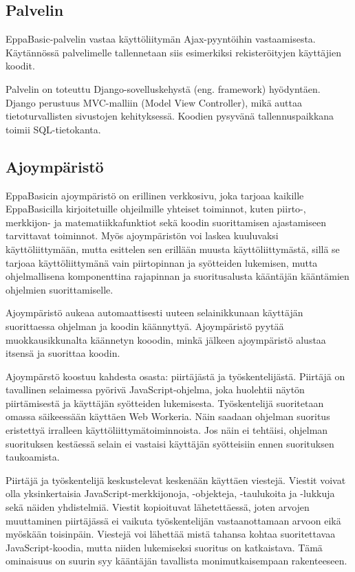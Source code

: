 \subsection{Palvelin}
EppaBasic-palvelin vastaa käyttöliitymän Ajax-pyyntöihin
vastaamisesta. Käytännössä palvelimelle tallennetaan
siis esimerkiksi rekisteröityjen käyttäjien koodit.

Palvelin on toteuttu Django-sovelluskehystä (eng. framework)
hyödyntäen. Django perustuus MVC-malliin (Model View Controller),
mikä auttaa tietoturvallisten sivustojen kehityksessä. Koodien
pysyvänä tallennuspaikkana toimii SQL-tietokanta.

\subsection{Ajoympäristö}
EppaBasicin ajoympäristö on erillinen verkkosivu,
joka tarjoaa kaikille EppaBasicilla kirjoitetuille
ohjeilmille yhteiset toiminnot, kuten piirto-,
merkkijon- ja matematiikkafunktiot sekä
koodin suorittamisen ajastamiseen tarvittavat toiminnot.
Myös ajoympäristön voi laskea kuuluvaksi käyttöliittymään,
mutta esittelen sen erillään muusta käyttöliittymästä,
sillä se tarjoaa käyttöliittymänä vain piirtopinnan
ja syötteiden lukemisen, mutta ohjelmallisena
komponenttina rajapinnan ja suoritusalusta kääntäjän
kääntämien ohjelmien suorittamiselle.

Ajoympäristö aukeaa automaattisesti uuteen selainikkunaan
käyttäjän suorittaessa ohjelman ja koodin käännyttyä.
Ajoympäristö pyytää muokkausikkunalta käännetyn kooodin,
minkä jälkeen ajoympäristö alustaa itsensä ja suorittaa koodin.

Ajoympärstö koostuu kahdesta osasta:
piirtäjästä ja työskentelijästä.
Piirtäjä on tavallinen selaimessa pyörivä
JavaScript-ohjelma, joka huolehtii
näytön piirtämisestä ja käyttäjän syötteiden lukemisesta.
Työskentelijä suoritetaan omassa säikeessään
käyttäen Web Workeria.
Näin saadaan ohjelman suoritus eristettyä
irralleen käyttöliittymätoiminnoista.
Jos näin ei tehtäisi, ohjelman suorituksen
kestäessä selain ei vastaisi käyttäjän
syötteisiin ennen suorituksen taukoamista.

Piirtäjä ja työskentelijä keskustelevat
keskenään käyttäen viestejä.
Viestit voivat olla yksinkertaisia
JavaScript-merkkijonoja,
-objekteja, -taulukoita ja -lukkuja
sekä näiden yhdistelmiä.
Viestit kopioituvat lähetettäessä,
joten arvojen muuttaminen piirtäjässä
ei vaikuta työskentelijän vastaanottamaan
arvoon eikä myöskään toisinpäin.
Viestejä voi lähettää mistä tahansa kohtaa
suoritettavaa JavaScript-koodia,
mutta niiden lukemiseksi suoritus on katkaistava.
Tämä ominaisuus on suurin syy kääntäjän
tavallista monimutkaisempaan rakenteeseen.

